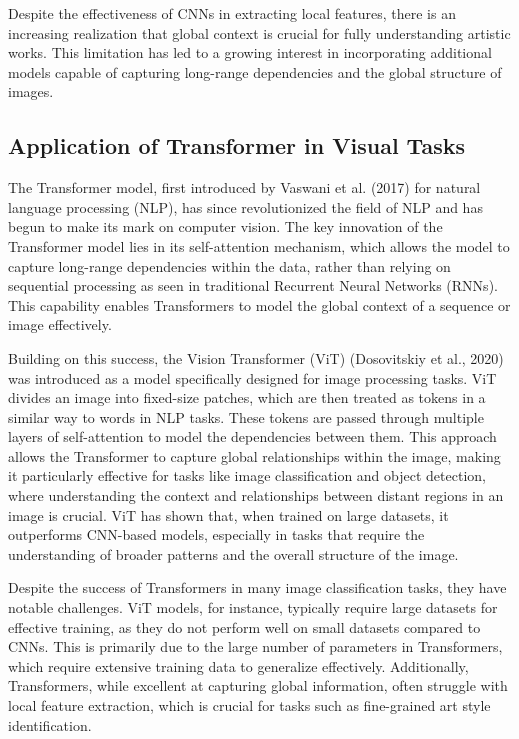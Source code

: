 Despite the effectiveness of CNNs in extracting local features, there is an increasing realization that global context is crucial for fully understanding artistic works. This limitation has led to a growing interest in incorporating additional models capable of capturing long-range dependencies and the global structure of images.

\subsection{Application of Transformer in Visual Tasks}

The Transformer model\cite{vaswani2017attention}, first introduced by Vaswani et al. (2017) for natural language processing (NLP), has since revolutionized the field of NLP and has begun to make its mark on computer vision. The key innovation of the Transformer model lies in its self-attention mechanism, which allows the model to capture long-range dependencies within the data, rather than relying on sequential processing as seen in traditional Recurrent Neural Networks (RNNs). This capability enables Transformers to model the global context of a sequence or image effectively.

Building on this success, the Vision Transformer (ViT) (Dosovitskiy et al., 2020)\cite{dosovitskiy2020image} was introduced as a model specifically designed for image processing tasks. ViT divides an image into fixed-size patches, which are then treated as tokens in a similar way to words in NLP tasks. These tokens are passed through multiple layers of self-attention to model the dependencies between them. This approach allows the Transformer to capture global relationships within the image, making it particularly effective for tasks like image classification and object detection, where understanding the context and relationships between distant regions in an image is crucial. ViT has shown that, when trained on large datasets, it outperforms CNN-based models, especially in tasks that require the understanding of broader patterns and the overall structure of the image.

Despite the success of Transformers in many image classification tasks, they have notable challenges. ViT models, for instance, typically require large datasets for effective training, as they do not perform well on small datasets compared to CNNs. This is primarily due to the large number of parameters in Transformers, which require extensive training data to generalize effectively. Additionally, Transformers, while excellent at capturing global information, often struggle with local feature extraction, which is crucial for tasks such as fine-grained art style identification.

